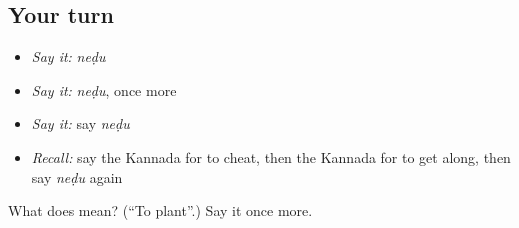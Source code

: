 \subsection*{Your turn}
\begin{itemize}
\raggedright
  \item \emph{Say it:} \emph{neḍu}
  \item \emph{Say it:} \emph{neḍu}, once more
  \item \emph{Say it:} say \emph{neḍu}
  \item \emph{Recall:} say the Kannada for to cheat, then the Kannada for to get along, then say \emph{neḍu} again
\end{itemize}

\begin{tcolorbox}[breakable,colback=teal!4,colframe=teal!35!black,title={Before you move on}]
What does  mean? (\textquotedblleft{}To plant\textquotedblright{}.) Say it once more.
\end{tcolorbox}
